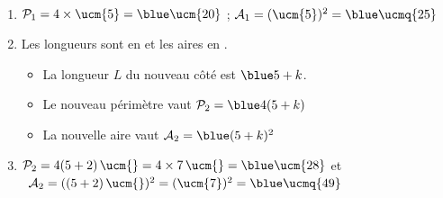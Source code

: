    \ \\ [-5mm]
   \begin{enumerate}
      \item $\mathcal{P}_1 =4\times\ucm{5} =\blue\ucm{20}$ ; $\mathcal{A}_1 =(\ucm{5})^2 =\blue\ucmq{25}$
      \item Les longueurs sont en \ucm{} et les aires en \ucmq{}.
      \begin{itemize}
         \item La longueur $L$ du nouveau côté est $\blue5+k$.
         \item Le nouveau périmètre vaut $\mathcal{P}_2 =\blue4(5+k)$
         \item La nouvelle aire vaut $\mathcal{A}_2 =\blue(5+k)^2$
      \end{itemize}
      \item $\mathcal{P}_2 =4(5+2) \, \ucm{} = 4\times7 \, \ucm{} =\blue\ucm{28}$ et \\
      \quad\, $\mathcal{A}_2 =((5+2)\,\ucm{})^2 =(\ucm{7})^2 =\blue\ucmq{49}$
   \end{enumerate}
